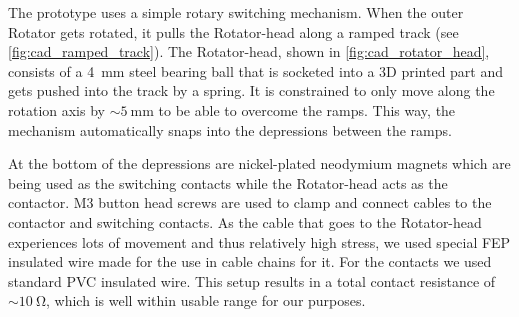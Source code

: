 \def\rotator{\textsf{Rotator}\xspace}
\def\rotatorhead{\textsf{Rotator-head}\xspace}

The prototype uses a simple rotary switching mechanism.
When the outer \rotator gets rotated, it pulls the \rotatorhead along a ramped track (see \autoref{fig:cad_ramped_track}).
The \rotatorhead, shown in \autoref{fig:cad_rotator_head}, consists of a \SI{4}{mm} steel bearing ball that is socketed into a 3D printed part and gets pushed into the track by a spring.
It is constrained to only move along the rotation axis by $\sim\SI{5}{\mm}$ to be able to overcome the ramps.
This way, the mechanism automatically snaps into the depressions between the ramps.

At the bottom of the depressions are nickel-plated neodymium magnets which are being used as the switching contacts while the \rotatorhead acts as the contactor.
M3 button head screws are used to clamp and connect cables to the contactor and switching contacts.
As the cable that goes to the \rotatorhead experiences lots of movement and thus relatively high stress, we used special FEP insulated wire made for the use in cable chains for it.
For the contacts we used standard PVC insulated wire.
This setup results in a total contact resistance of $\sim\SI{10}{\ohm}$, which is well within usable range for our purposes.

